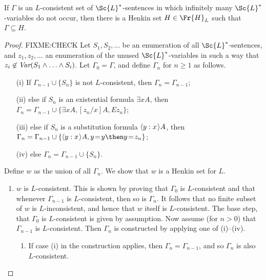 \documentclass[11pt]{woarticle}
\theoremstyle{break}
\theoremstyle{nonumberplain}
\newcommand{\1}{\;\,|\;\,}
\newcommand{\var}{\emph{Var}}
\renewcommand{\t}[1]{\ensuremath{\langle #1  \makebox[.2ex]{}\rangle}}
\begin{document}
\begin{lemma}\label{extensibility}
  If $\Gamma$ is an $L$-consistent set of $\Sc{L}^*$-sentences in
  which infinitely many $\Sc{L}^*$-variables do not occur, then there
  is a Henkin set $H \in \Fr{H}_L$ such that $\Gamma \subseteq H$.
\end{lemma}

\begin{proof}
  FIXME:CHECK
  Let $S_1,S_2,\ldots$ be an enumeration of all
  $\Sc{L}^*$-sentences, and $z_1,z_2,\ldots$ an enumeration of the
  unused $\Sc{L}^*$-variables in such a way that $z_i \not\in
  \var(S_1\land\ldots\land S_i)$. Let $\Gamma_0 = \Gamma$, and define
  $\Gamma_n$ for $n \geq 1$ as follows.
  \begin{enumerate}
  \item[(i)] If $\Gamma_{n-1} \cup \{ S_n \}$ is not
    $L$-consistent, then $\Gamma_n = \Gamma_{n-1}$;
  \item[(ii)] else if $S_n$ is an existential formula $\exists x A$,
    then $\Gamma_n = \Gamma_{n-1} \cup \{ \exists x A, [z_n/x] A, Ez_n
    \}$;
  \item[(iii)] else if $S_n$ is a substitution formula $\t{y:x}A$,
    then $\Gamma_n = \Gamma_{n-1} \cup \{ \t{y:x}A, y\!=\!y \then y\!=\!z_n \}$;
  \item[(iv)] else $\Gamma_n = \Gamma_{n-1} \cup \{ S_n \}$.
  \end{enumerate}
  Define $w$ as the union of all $\Gamma_n$. We show that $w$ is a
  Henkin set for $L$.

  \begin{enumerate}

  \item $w$ is $L$-consistent. This is shown by proving that
    $\Gamma_0$ is $L$-consistent and that whenever $\Gamma_{n-1}$ is
    $L$-consistent, then so is $\Gamma_n$. It follows that no finite
    subset of $w$ is $L$-inconsistent, and hence that $w$ itself is
    $L$-consistent. The base step, that $\Gamma_0$ is $L$-consistent
    is given by assumption. Now assume (for $n > 0$) that
    $\Gamma_{n-1}$ is $L$-consistent. Then $\Gamma_n$ is constructed
    by applying one of (i)--(iv).

    \begin{enumerate}

    \item If case (i) in the construction applies, then $\Gamma_n =
      \Gamma_{n-1}$, and so $\Gamma_n$ is also $L$-consistent.


\end{enumerate}
\end{enumerate}
\end{proof}
\end{document}

